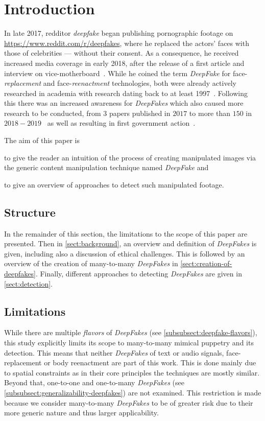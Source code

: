 \section{Introduction}
In late 2017, \gls{redditor} \textit{deepfake} began publishing pornographic footage
on \url{https://www.reddit.com/r/deepfakes}, where he replaced the actors' faces
with those of celebrities --- without their consent. As a consequence, he
received increased media coverage in early 2018, after the release of a first 
article and interview on vice-motherboard~\cite{Cole.2017}. While he coined the
term \textit{DeepFake} for face-\textit{replacement} and face-\textit{reenactment}
technologies, both were already actively researched in academia with research 
dating back to at least 1997~\cite{Bregler.1997}.
Following this there was an increased awareness for \textit{DeepFakes} which also
caused more research to be conducted, from \(3\) papers published in \(2017\) to
more than \(150\) in \(2018-2019\)~\cite{mirsky_creation_2020} as well as
resulting in first government action~\cite{senate_-_homeland_security_and_governmental_affairs__house_-_energy_and_commerce_deepfake_2019}.

\par
The aim of this paper is
\begin{enumerate*}[a.)]
    \item to give the reader an intuition of the process of creating manipulated
    images via the generic content manipulation technique named \textit{DeepFake}
    and
    \item to give an overview of approaches to detect such manipulated footage.
\end{enumerate*}

\subsection{Structure}
In the remainder of this section, the limitations to the scope of this paper are
presented. Then in \cref{sect:background}, an overview and definition of \textit{DeepFakes}
is given, including also a discussion of ethical challenges.
This is followed by an overview of the creation of many-to-many \textit{DeepFakes}
in \cref{sect:creation-of-deepfakes}. Finally, different approaches to detecting
\textit{DeepFakes} are given in \cref{sect:detection}.

\subsection{Limitations}\label{subsect:limitations}
While there are multiple \textit{flavors} of \textit{DeepFakes} (see \cref{subsubsect:deepfake-flavors}),
this study explicitly limits its scope to many-to-many mimical puppetry and its
detection. This means that neither \textit{DeepFakes} of text or audio signals,
face-replacement or body reenactment are part of this work. This is done mainly
due to spatial constraints as in their core principles the techniques are mostly
similar. Beyond that, one-to-one and one-to-many \textit{DeepFakes} (see \cref{subsubsect:generalizability-deepfakes})
are not examined. This restriction is made because we consider many-to-many \textit{DeepFakes}
to be of greater risk due to their more generic nature and thus larger applicability.